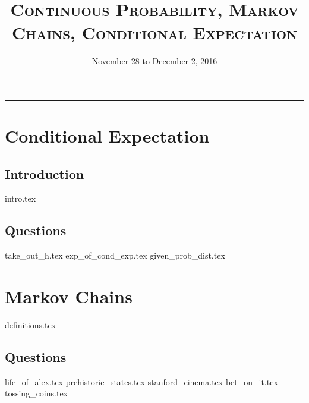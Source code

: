 \documentclass{exam}
\title{\textsc{Continuous Probability, Markov Chains, Conditional Expectation}}
\date{November 28 to December 2, 2016}
\begin{document}
\maketitle
\rule{\textwidth}{0.15em}
\fontsize{12}{15}\selectfont
\thispagestyle{empty}


\section{Conditional Expectation}
\subsection{Introduction}
{intro.tex}
\subsection{Questions}
\begin{questions}
{take_out_h.tex}
{exp_of_cond_exp.tex}
{given_prob_dist.tex}
\end{questions}

\section{Markov Chains}
{definitions.tex}
\subsection{Questions}
\begin{questions}
{life_of_alex.tex}
{prehistoric_states.tex}
{stanford_cinema.tex}
{bet_on_it.tex}
{tossing_coins.tex}
\end{questions}
\end{document}
